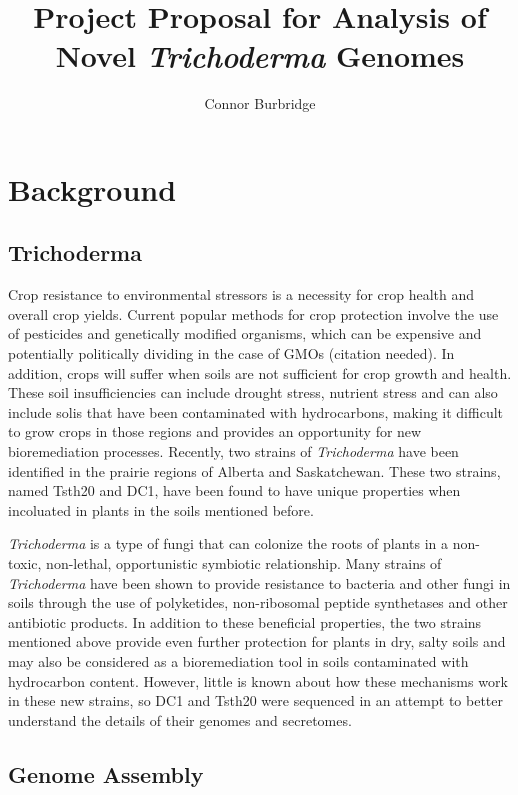 \documentclass[12pt]{article}
\title{Project Proposal for Analysis of Novel \textit{Trichoderma} Genomes}
\author{Connor Burbridge}
\affil{USask NSID: cbe453 \\
  USask ID no.\ 11162928 \\
  Supervisors: Dave Schneider \& Tony Kusalik\\}
\begin{document}
\parindent=14pt
\maketitle

\clearpage
\tableofcontents
\clearpage

\section{Background}

\subsection{Trichoderma}

Crop resistance to environmental stressors is a necessity for crop
health and overall crop yields. Current popular methods for crop
protection involve the use of pesticides and genetically modified
organisms, which can be expensive and potentially politically dividing
in the case of GMOs (citation needed). In addition, crops will suffer
when soils are not sufficient for crop growth and health. These soil
insufficiencies can include drought stress, nutrient stress and can
also include solis that have been contaminated with hydrocarbons,
making it difficult to grow crops in those regions and provides an
opportunity for new bioremediation processes. Recently, two strains of
\textit{Trichoderma} have been identified in the prairie regions of
Alberta and Saskatchewan. These two strains, named Tsth20 and DC1,
have been found to have unique properties when incoluated in plants in
the soils mentioned before.

\textit{Trichoderma} is a type of fungi that can colonize the roots of
plants in a non-toxic, non-lethal, opportunistic symbiotic
relationship.\cite{Trichoderma} Many strains of \textit{Trichoderma}
have been shown to provide resistance to bacteria and other fungi in
soils through the use of polyketides, non-ribosomal peptide
synthetases and other antibiotic
products\cite{Trichoderma}\cite{Secretome}. In addition to these
beneficial properties, the two strains mentioned above provide even
further protection for plants in dry, salty soils and may also be
considered as a bioremediation tool in soils contaminated with
hydrocarbon content. However, little is known about how these
mechanisms work in these new strains, so DC1 and Tsth20 were sequenced
in an attempt to better understand the details of their genomes and
secretomes.

\subsection{Genome Assembly}
\end{document}
